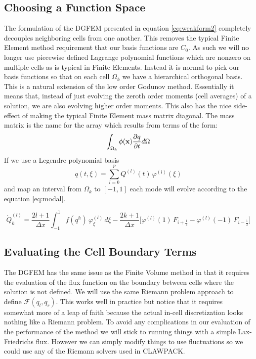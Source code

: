 \documentclass[10]{amsart}
\begin{document}
 \subsection{Choosing a Function Space}
 The formulation of the DGFEM presented in equation \eqref{eq:weakform2} completely decouples neighboring cells from
 one another.
 This removes the typical Finite Element method requirement that our basis functions are $C_0$. As such we will no longer
 use piecewise defined Lagrange polynomial functions which are nonzero on multiple cells as is typical in Finite Elements. 
 Instead it is normal to pick our basis functions so that on each
 cell $\Omega_k$ we have a hierarchical orthogonal basis. This is a natural extension of the low order Godunov method.
 Essentially it means that, instead of just evolving the zeroth order moments (cell averages) of a solution, we are also
 evolving higher order moments. This also has the nice side-effect of making the typical Finite Element mass matrix  
 diagonal. The mass matrix is the name for the array which results from terms of the form:
 $$\int_{\Omega_k} \phi({\bf x}) \frac{\partial q}{\partial t} d\Omega $$
 If we use a Legendre polynomial basis 
 \[ q(t,\xi) = \sum_{l=0}^p Q^{(l)}(t) \, \varphi^{(l)}(\xi) \]
 and map an interval from $\Omega_k$ to $[-1,1]$ each
 mode will evolve according to the equation \ref{eq:modal}.
 
 	 \begin{equation}
 \dot{Q}^{(l)}_k = 
		\frac{2 l +1}{\Delta x} \int_{-1}^{1} f \left( q^h \right) \, \varphi^{(l)}_{\xi}
			 \, d\xi
			 - \frac{2k +1}{\Delta x} \biggl[
	 	\varphi^{(l)}(1) \, F_{i+\frac{1}{2}} - \varphi^{(l)}(-1) \, F_{i-\frac{1}{2}} \biggr]
	 	\label{eq:modal}
 	 \end{equation}

 \subsection{Evaluating the Cell Boundary Terms}
 The DGFEM has the same issue as the Finite Volume method in that it requires the evaluation of the flux function
 on the boundary between cells where the solution is not defined. 
 We will use the same Riemann problem approach to define $\mathcal{F}(q_l,q_r)$.
 This works well in practice but notice that it requires somewhat
 more of a leap of faith because the actual in-cell discretization looks nothing like a Riemann problem.
 To avoid any complications in our evaluation of the performance of the method we will stick to running things with
 a simple Lax-Friedrichs flux. However we can simply modify things to use fluctuations so we could use any of the Riemann
 solvers used in CLAWPACK.
\end{document}
